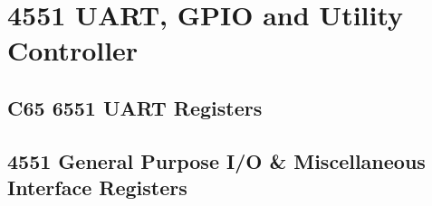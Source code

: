\chapter{4551 UART, GPIO and Utility Controller}

\section{C65 6551 UART Registers}



\section{4551 General Purpose I/O \& Miscellaneous Interface Registers}
\label{sec:uartmisc}


